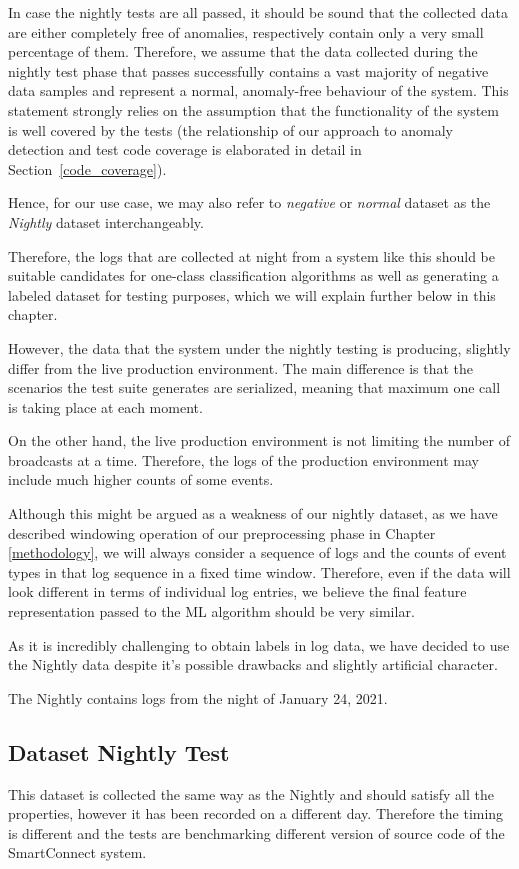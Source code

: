 In case the nightly tests are all passed, it should be sound that the collected data are either completely free of anomalies, respectively contain only a very small percentage of them. 
Therefore, we assume that the data collected during the nightly test phase that passes successfully contains a vast majority of negative data samples and represent a normal, anomaly-free behaviour of the system. This statement strongly relies on the assumption that the functionality of the system is well covered by the tests (the relationship of our approach to anomaly detection and test code coverage is elaborated in detail in Section~\ref{code_coverage}). 

Hence, for our use case, we may also refer to \textit{negative} or \textit{normal} dataset as the \textit{Nightly} dataset interchangeably.

Therefore, the logs that are collected at night from a system like this should be suitable candidates for one-class classification algorithms as well as generating a labeled dataset for testing purposes, which we will explain further below in this chapter.

However, the data that the system under the nightly testing is producing, slightly differ from the live production environment. The main difference is that the scenarios the test suite generates are serialized, meaning that maximum one call is taking place at each moment. 

On the other hand, the live production environment is not limiting the number of broadcasts at a time. Therefore, the logs of the production environment may include much higher counts of some events.

Although this might be argued as a weakness of our nightly dataset, as we have described windowing operation of our preprocessing phase in Chapter \ref{methodology}, we will always consider a sequence of logs and the counts of event types in that log sequence in a fixed time window. Therefore, even if the data will look different in terms of individual log entries, we believe the final feature representation passed to the ML algorithm should be very similar.

As it is incredibly challenging to obtain labels in log data, we have decided to use the Nightly data despite it's possible drawbacks and slightly artificial character.

The Nightly contains logs from the night of January 24, 2021.

\subsection{Dataset Nightly Test}
This dataset is collected the same way as the Nightly and should satisfy all the properties, however it has been recorded on a different day. Therefore the timing is different and the tests are benchmarking different version of source code of the SmartConnect system.

